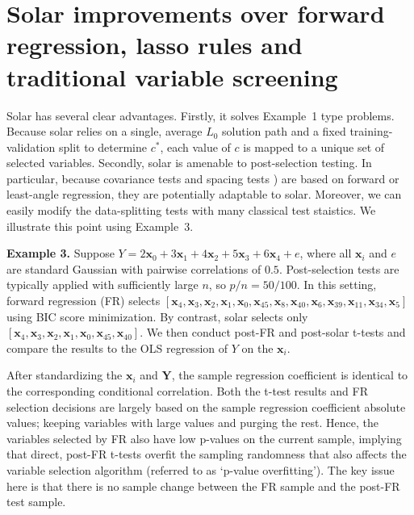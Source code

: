 \documentclass[12pt]{article}
\begin{document}
\section{Solar improvements over forward regression, lasso rules and traditional variable screening \label{section:adv}}

Solar has several clear advantages. Firstly, it solves Example~1 type problems. Because solar relies on a single, average $L_0$ solution path and a fixed training-validation split to determine $c^*$, each value of $c$ is mapped to a unique set of selected variables. Secondly, solar is amenable to post-selection testing. In particular, because covariance tests \citep{lockhartall14} and spacing tests \citep{taylor2014exact}) are based on forward or least-angle regression, they are potentially adaptable to solar. Moreover, we can easily modify the data-splitting tests \citep{wasserman2009high,meinshausen2009p} with many classical test staistics. We illustrate this point using Example~3.

\bigskip
\noindent
\textbf{Example 3.} Suppose $Y = 2 \mathbf{x}_0 + 3 \mathbf{x}_1 + 4 \mathbf{x}_2 + 5 \mathbf{x}_3 + 6 \mathbf{x}_4  + e$, where all $\mathbf{x}_i$ and $e$ are standard Gaussian with pairwise correlations of $0.5$. Post-selection tests are typically applied with sufficiently large $n$, so $p/n=50/100$. In this setting, forward regression (FR) selects $\left[\mathbf{x}_4, \mathbf{x}_3, \mathbf{x}_2, \mathbf{x}_1, \mathbf{x}_0, \mathbf{x}_{45}, \mathbf{x}_{8}, \mathbf{x}_{40}, \mathbf{x}_{6}, \mathbf{x}_{39}, \mathbf{x}_{11}, \mathbf{x}_{34}, \mathbf{x}_{5} \right]$ using BIC score minimization. By contrast, solar selects only $\left[\mathbf{x}_4, \mathbf{x}_3, \mathbf{x}_2, \mathbf{x}_1, \mathbf{x}_0, \mathbf{x}_{45}, \mathbf{x}_{40} \right]$. We then conduct post-FR and post-solar t-tests and compare the results to the OLS regression of $Y$ on the $\mathbf{x}_i$.

After standardizing the $\mathbf{x}_i$ and $\mathbf{Y}$, the sample regression coefficient is identical to the corresponding conditional correlation. Both the t-test results and FR selection decisions are largely based on the sample regression coefficient absolute values; keeping variables with large values and purging the rest. Hence, the variables selected by FR also have low p-values on the current sample, implying that direct, post-FR t-tests overfit the sampling randomness that also affects the variable selection algorithm (referred to as `p-value overfitting'). The key issue here is that there is no sample change between the FR sample and the post-FR test sample.
\end{document}
